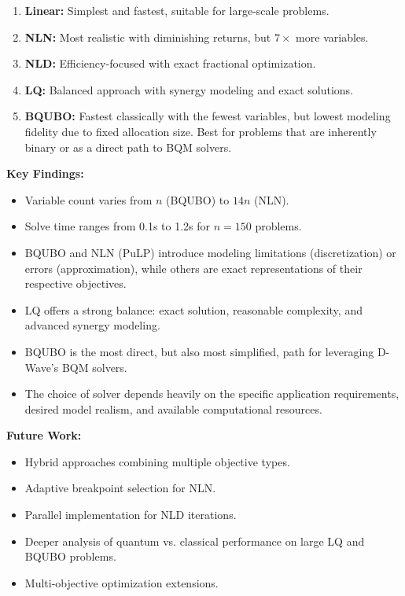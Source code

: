 \documentclass[11pt,a4paper]{article}
\begin{document}
\begin{enumerate}
    \item \textbf{Linear:} Simplest and fastest, suitable for large-scale problems.
    \item \textbf{NLN:} Most realistic with diminishing returns, but $7\times$ more variables.
    \item \textbf{NLD:} Efficiency-focused with exact fractional optimization.
    \item \textbf{LQ:} Balanced approach with synergy modeling and exact solutions.
    \item \textbf{BQUBO:} Fastest classically with the fewest variables, but lowest modeling fidelity due to fixed allocation size. Best for problems that are inherently binary or as a direct path to BQM solvers.
\end{enumerate}

\textbf{Key Findings:}
\begin{itemize}
    \item Variable count varies from $n$ (BQUBO) to $14n$ (NLN).
    \item Solve time ranges from 0.1s to 1.2s for $n=150$ problems.
    \item BQUBO and NLN (PuLP) introduce modeling limitations (discretization) or errors (approximation), while others are exact representations of their respective objectives.
    \item LQ offers a strong balance: exact solution, reasonable complexity, and advanced synergy modeling.
    \item BQUBO is the most direct, but also most simplified, path for leveraging D-Wave's BQM solvers.
    \item The choice of solver depends heavily on the specific application requirements, desired model realism, and available computational resources.
\end{itemize}

\textbf{Future Work:}
\begin{itemize}
    \item Hybrid approaches combining multiple objective types.
    \item Adaptive breakpoint selection for NLN.
    \item Parallel implementation for NLD iterations.
    \item Deeper analysis of quantum vs. classical performance on large LQ and BQUBO problems.
    \item Multi-objective optimization extensions.
\end{itemize}
\end{document}
